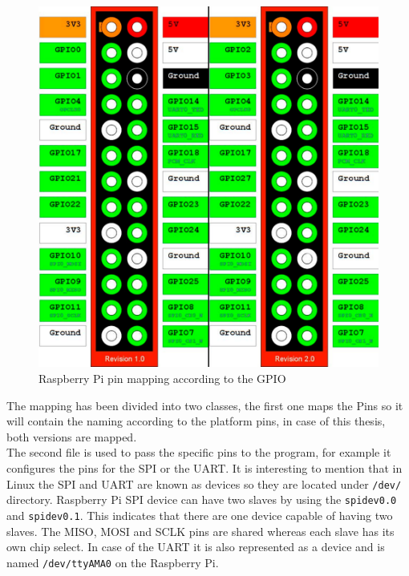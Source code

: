 \begin{figure}[H]\begin{center}
 \centering
  \captionsetup{justification=centering}
  \includegraphics[scale=0.30]{pictures/iosharp/mapping-raspberrypi}
  \caption{Raspberry Pi pin mapping according to the GPIO\label{fig:mapping-rpi}}
\end{center}\end{figure}

The mapping has been divided into two classes, the first one maps the Pins so it will contain the naming according to the platform pins, in case of this thesis, both versions are mapped.
\\
The second file is used to pass the specific pins to the program, for example it configures the pins for the SPI or the UART. It is interesting to mention that in Linux the SPI and UART are known as devices so they are located under \verb!/dev/! directory. Raspberry Pi SPI device can have two slaves by using the \verb!spidev0.0! and \verb!spidev0.1!. This indicates that there are one device capable of having two slaves. The MISO, MOSI and SCLK pins are shared whereas each slave has its own chip select. In case of the UART it is also represented as a device and is named \verb!/dev/ttyAMA0! on the Raspberry Pi.